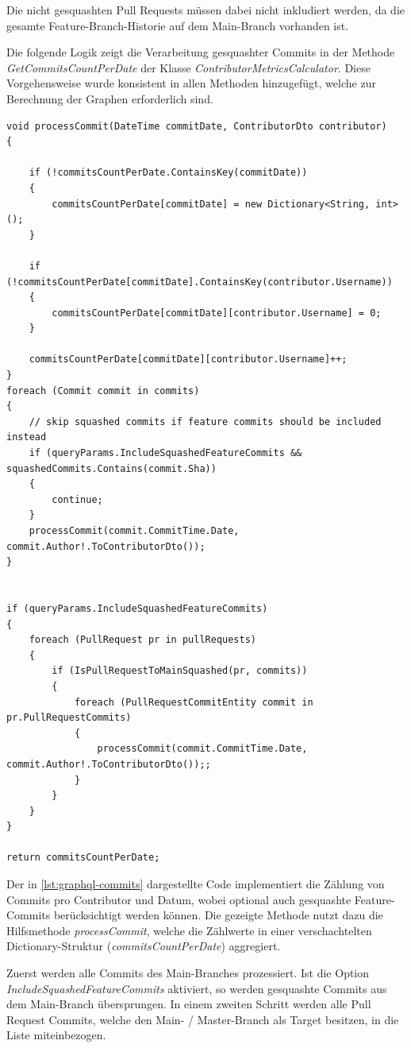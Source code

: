 Die nicht gesquashten Pull Requests müssen dabei nicht inkludiert werden, da die gesamte Feature-Branch-Historie auf dem Main-Branch vorhanden ist. 

Die folgende Logik zeigt die Verarbeitung gesquashter Commits in der Methode \textit{GetCommitsCountPerDate} der Klasse \textit{ContributorMetricsCalculator}. Diese Vorgehensweise wurde konsistent in allen Methoden hinzugefügt, welche zur Berechnung der Graphen erforderlich sind.

\begin{lstlisting}[language=CSharp, caption={Verarbeitung gesquashter Commits in der Methode \textit{GetCommitsCountPerDate}}, label={lst:graphql-commits}]
void processCommit(DateTime commitDate, ContributorDto contributor)
{

	if (!commitsCountPerDate.ContainsKey(commitDate))
	{
		commitsCountPerDate[commitDate] = new Dictionary<String, int>();
	}

	if (!commitsCountPerDate[commitDate].ContainsKey(contributor.Username))
	{
		commitsCountPerDate[commitDate][contributor.Username] = 0;
	}

	commitsCountPerDate[commitDate][contributor.Username]++;
}
foreach (Commit commit in commits)
{
	// skip squashed commits if feature commits should be included instead
	if (queryParams.IncludeSquashedFeatureCommits && squashedCommits.Contains(commit.Sha))
	{
		continue;
	}
	processCommit(commit.CommitTime.Date, commit.Author!.ToContributorDto());
}


if (queryParams.IncludeSquashedFeatureCommits)
{
	foreach (PullRequest pr in pullRequests)
	{
		if (IsPullRequestToMainSquashed(pr, commits))
		{
			foreach (PullRequestCommitEntity commit in pr.PullRequestCommits)
			{
				processCommit(commit.CommitTime.Date, commit.Author!.ToContributorDto());;		
			}	
		}
	}
}

return commitsCountPerDate;
\end{lstlisting}

Der in \autoref{lst:graphql-commits} dargestellte Code implementiert die Zählung von Commits pro Contributor und Datum, wobei optional auch gesquashte Feature-Commits berücksichtigt werden können. Die gezeigte Methode nutzt dazu die Hilfsmethode \textit{processCommit}, welche die Zählwerte in einer verschachtelten Dictionary-Struktur (\textit{commitsCountPerDate}) aggregiert.

Zuerst werden alle Commits des Main-Branches prozessiert. Ist die Option \textit{IncludeSquashedFeatureCommits} aktiviert, so werden gesquashte Commits aus dem Main-Branch übersprungen. In einem zweiten Schritt werden alle Pull Request Commits, welche den Main- / Master-Branch als Target besitzen, in die Liste miteinbezogen. 

